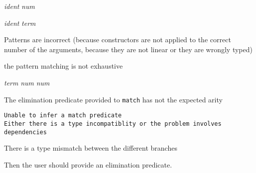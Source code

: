 \begin{ErrMsgs}
\item {} {\sl
    ident}  {\sl num} 
  
  {\sl ident}  {\sl term}
  
  {\term}
  {\term} 

 Patterns are incorrect (because constructors are not applied to
  the correct number of the arguments, because they are not linear or
  they are wrongly typed)

\item {}

the pattern matching is not exhaustive

\item {} {\sl term}  {\sl num}  {\sl
    num} 

The elimination predicate provided to \texttt{match} has not the
  expected arity



 
  
\item {\tt Unable to infer a match predicate\\
    Either there is a type incompatiblity or the problem involves\\
    dependencies}
 
  There is a type mismatch between the different branches

  Then the user should provide an elimination predicate.


\end{ErrMsgs}
